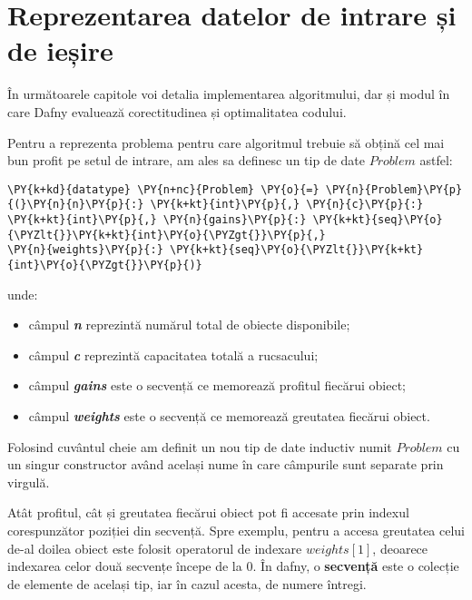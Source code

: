 \lstset{style=mylststyle}
\begin{sloppypar}

\chapter{Reprezentarea datelor de intrare și de ieșire}

În următoarele capitole voi detalia implementarea algoritmului, dar și modul în care Dafny evaluează corectitudinea și optimalitatea codului. \par 
Pentru a reprezenta problema pentru care algoritmul trebuie să obțină cel mai bun profit pe setul de intrare, am ales sa definesc un tip de date $Problem$ astfel:

\begin{Verbatim}[commandchars=\\\{\}]
\PY{k+kd}{datatype} \PY{n+nc}{Problem} \PY{o}{=} \PY{n}{Problem}\PY{p}{(}\PY{n}{n}\PY{p}{:} \PY{k+kt}{int}\PY{p}{,} \PY{n}{c}\PY{p}{:} \PY{k+kt}{int}\PY{p}{,} \PY{n}{gains}\PY{p}{:} \PY{k+kt}{seq}\PY{o}{\PYZlt{}}\PY{k+kt}{int}\PY{o}{\PYZgt{}}\PY{p}{,} 
\PY{n}{weights}\PY{p}{:} \PY{k+kt}{seq}\PY{o}{\PYZlt{}}\PY{k+kt}{int}\PY{o}{\PYZgt{}}\PY{p}{)} 
\end{Verbatim}
unde:
\begin{itemize}
    \item câmpul \textit{\textbf{\textcolor{coleight}{n}}} reprezintă numărul total de obiecte disponibile;
    \item câmpul \textit{\textbf{\textcolor{coleight}{c}}} reprezintă capacitatea totală a rucsacului;
    \item câmpul \textit{\textbf{\textcolor{coleight}{gains}}} este o secvență ce memorează profitul fiecărui obiect;
    \item câmpul \textit{\textbf{\textcolor{coleight}{weights}}} este o secvență ce memorează greutatea fiecărui obiect.
\end{itemize} \par
Folosind cuvântul cheie  am definit un nou tip de date inductiv numit $Problem$ cu un singur constructor având același nume în care câmpurile sunt separate prin virgulă.
\par
Atât profitul, cât și greutatea fiecărui obiect pot fi accesate prin indexul corespunzător poziției din secvență. Spre exemplu, pentru a accesa greutatea celui de-al doilea obiect este folosit operatorul de indexare $weights[1]$, deoarece indexarea celor două secvențe începe de la 0. În dafny, o \textbf{secvență} este o colecție de elemente de același tip, iar în cazul acesta, de numere întregi.  \par

\end{sloppypar}
